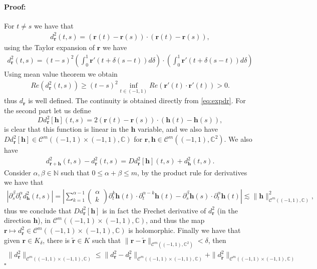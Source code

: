 \documentclass{article}
\newenvironment{proof}{\paragraph{Proof:}}{\hfill$\square$}
\newcommand{\IC}{{\mathbb C}}
\newcommand{\IN}{{\mathbb N}}
\newcommand{\cmspace}[3]{\mathcal{C}^{#1} \left( #2, #3 \right)}
\newcommand{\bh}{\bm{h}}
\newcommand{\br}{\bm{r}}
\newcommand{\iinterv}{(-1,1)\times(-1,1)}
\begin{document}
\begin{proof}
For $t \neq s$ we have that
\begin{align*}
d_{\br}^2(t,s) = (\br(t)-\br(s))\cdot (\br(t) -\br(s)),
\end{align*}
using the Taylor expansion of $\br$ we have 
\begin{align}
\label{eq:expdr}
d_{\br}^2(t,s) = (t-s)^2 \left(\int_{0}^1 \br'(t+\delta(s-t))d\delta \right) \cdot \left(\int_{0}^1 \br'(t+\delta(s-t))d\delta \right)
\end{align}
Using mean value theorem we obtain 
\begin{align*}
Re ( d_{\br}^2(t,s)  )  \geq (t-s)^2 \inf_{t \in (-1,1)} Re(\br'(t) \cdot \br'(t)) >0.
\end{align*}
thus $d_{\br}$ is well defined. The continuity is obtained directly from \eqref{eq:expdr}. For the second part let us define 
$$
D d_{\br}^2[\bh](t,s) = 2 (\br(t)-\br(s))\cdot (\bh(t) - \bh(s)),
$$
is clear that this function is linear in the $\bh$ variable, and we also have $D d_{\br}^2[\bh] \in \cmspace{m}{\iinterv}{\IC}$ for $\br,\bh \in \cmspace{m}{(-1,1)}{\IC^2}$. We also have 
\begin{align*}
d^2_{\br+\bh}(t,s) -d^2_{\br}(t,s) =  D d_{\br}^2[\bh](t,s) + d^2_{\bh}(t,s).
\end{align*}
Consider $\alpha, \beta \in \IN$ such that $0 \leq \alpha +\beta \leq m$, by the product rule for derivatives we have that 
\begin{align*}
 \left\vert\partial_s^\beta \partial_t^\alpha d^2_{\bh}(t,s) \right\vert= \left\vert\sum_{k=1}^{\alpha-1} \begin{pmatrix} \alpha \\ k \end{pmatrix} \partial_t^k \bh(t) \cdot \partial^{\alpha-k}_t \bh(t) - \partial_s^\beta \bh(s) \cdot \partial^\alpha_t \bh(t)\right\vert \lesssim \| \bh\|^2_{\cmspace{m}{(-1,1)}{\IC}},
\end{align*} 
thus we conclude that $D d_{\br}^2[\bh]$ is in fact the Frechet derivative of $d^2_{\br}$ (in the direction $\bh$), in $\cmspace{m}{\iinterv}{\IC}$, and thus the map $\br  \mapsto d_{\br}^2 \in \cmspace{m}{(-1,1)\times(-1,1)}{\IC}$ is holomorphic. Finally we have that given $\br \in K_\delta$, there is $\widetilde{\br} \in K$ such that $\| \br - \widetilde{\br}\|_{\cmspace{m}{(-1,1)}{\IC^2}} < \delta$, then 
\begin{align*}
\| d^2_{\br} \|_{\cmspace{m}{\iinterv}{\IC}} \leq \| d^2_{\br}  - d_{\widetilde{\br}}^2 \|_{\cmspace{m}{\iinterv}{\IC}}  + \| d_{\widetilde{\br}}^2 \|_{\cmspace{m}{\iinterv}{\IC}}

\end{align*}
\end{proof}
\end{document}
